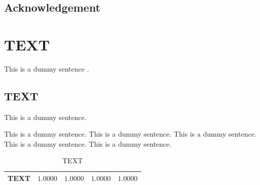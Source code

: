 \documentclass[12pt]{book}
\begin{document}
\begin{singlespacing}\tableofcontents\end{singlespacing}\setcounter{page}{5}\clearpage\phantom{}\setcounter{page}{0}\clearpage

\begin{singlespacing}\listoftables\end{singlespacing}\setcounter{page}{6}\clearpage\phantom{}\setcounter{page}{0}\clearpage

\begin{singlespacing}\listoffigures\end{singlespacing}\setcounter{page}{7}\clearpage\phantom{}\setcounter{page}{0}\clearpage

\begin{singlespacing}\chapter*{Acknowledgement}
\lipsum[1]\par\end{singlespacing}
\setcounter{page}{8}\clearpage\phantom{}\setcounter{page}{0}\clearpage

\mainmatter
\chapter{TEXT}
This is a dummy sentence \citep{fama1992cross}.

\section{TEXT}
This is a dummy sentence.
\clearpage

\begin{table}
\caption{TEXT}\footnotesize
This is a dummy sentence. This is a dummy sentence. This is a dummy sentence. This is a dummy sentence. This is a dummy sentence.\par\centering
\begin{tabu}{*5{X[c,m]}}\toprule
TEXT & $1.0000$ & $1.0000$ & $1.0000$ & $1.0000$ \\\bottomrule
\end{tabu}
\end{table}
\clearpage
\end{document}
